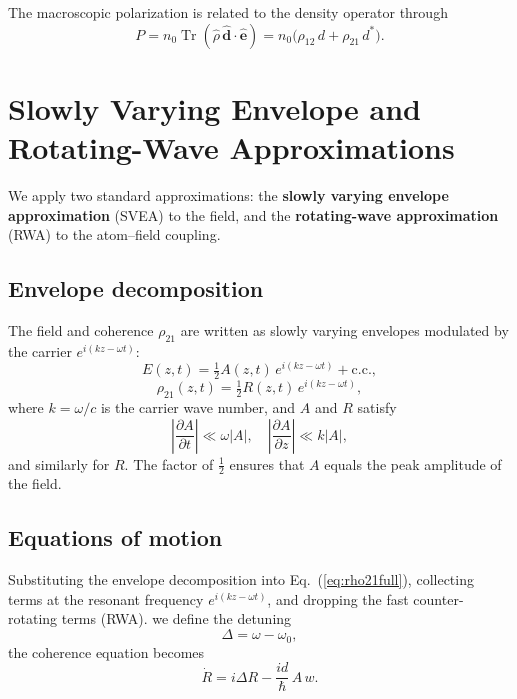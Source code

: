 \documentclass[12pt,a4paper]{article}
\newcommand{\pderiv}[2]{\dfrac{\partial #1}{\partial #2}}
\begin{document}
The macroscopic polarization is related to the density operator through
\begin{equation}
  P = n_0\operatorname{Tr}(\hat{\rho}\,\hat{\bm{d}}\cdot\hat{\bm{e}})
    = n_0\bigl(\rho_{12}\,d + \rho_{21}\,d^*\bigr).
\end{equation}

\section{Slowly Varying Envelope and Rotating-Wave Approximations}

We apply two standard approximations: the \textbf{slowly varying envelope
approximation} (SVEA) to the field, and the \textbf{rotating-wave
approximation} (RWA) to the atom--field coupling.

\subsection{Envelope decomposition}

The field and coherence $\rho_{21}$ are written as slowly varying envelopes
modulated by the carrier $e^{i(kz-\omega t)}$:
\begin{equation}
  E(z,t) = \tfrac{1}{2}A(z,t)\,e^{i(kz-\omega t)} + \mathrm{c.c.},
\end{equation}
\begin{equation}
  \rho_{21}(z,t) = \tfrac{1}{2}R(z,t)\,e^{i(kz-\omega t)},
\end{equation}
where $k = \omega/c$ is the carrier wave number, and $A$ and $R$ satisfy
\begin{equation}
  \left|\pderiv{A}{t}\right| \ll \omega|A|,
  \quad
  \left|\pderiv{A}{z}\right| \ll k|A|,
\end{equation}
and similarly for $R$. The factor of $\tfrac{1}{2}$ ensures that $A$ equals
the peak amplitude of the field.

\subsection{Equations of motion}

Substituting the envelope decomposition into Eq.~(\ref{eq:rho21full}),
collecting terms at the resonant frequency $e^{i(kz-\omega t)}$,
and dropping the fast counter-rotating terms (RWA). we define the detuning
\begin{equation}
  \Delta = \omega - \omega_0,
\end{equation}
the coherence equation becomes
\begin{equation}
  \dot{R} = i\Delta R - \frac{id}{\hbar}\,A\,w.
\end{equation}
\end{document}
